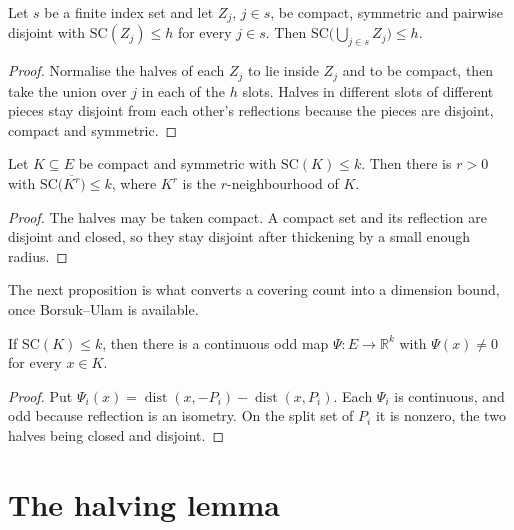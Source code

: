 \begin{lemma}
\label{lem:split-cover-union}
\leanok
Let $s$ be a finite index set and let $Z_j$, $j \in s$, be compact, symmetric and
pairwise disjoint with $\mathrm{SC}(Z_j) \le h$ for every $j \in s$. Then
$\mathrm{SC}\bigl( \bigcup_{j \in s} Z_j \bigr) \le h$.
\end{lemma}
\begin{proof}
\leanok
{}
Normalise the halves of each $Z_j$ to lie inside $Z_j$ and to be compact, then take
the union over $j$ in each of the $h$ slots. Halves in different slots of different
pieces stay disjoint from each other's reflections because the pieces are disjoint,
compact and symmetric.
\end{proof}

\begin{lemma}
\label{lem:split-cover-thickening}
\leanok
{}
Let $K \subseteq E$ be compact and symmetric with $\mathrm{SC}(K) \le k$. Then there
is $r > 0$ with $\mathrm{SC}\bigl( \overline{K^r} \bigr) \le k$, where $K^r$ is the
$r$-neighbourhood of $K$.
\end{lemma}
\begin{proof}
\leanok
The halves may be taken compact. A compact set and its reflection are disjoint and
closed, so they stay disjoint after thickening by a small enough radius.
\end{proof}

The next proposition is what converts a covering count into a dimension bound, once
Borsuk--Ulam is available.

\begin{proposition}
\label{prop:split-cover-odd-map}
\leanok
{}
If $\mathrm{SC}(K) \le k$, then there is a continuous odd map
$\Psi : E \to \mathbb{R}^k$ with $\Psi(x) \neq 0$ for every $x \in K$.
\end{proposition}
\begin{proof}
\leanok
Put $\Psi_i(x) = \operatorname{dist}(x, -P_i) - \operatorname{dist}(x, P_i)$. Each
$\Psi_i$ is continuous, and odd because reflection is an isometry. On the split set of
$P_i$ it is nonzero, the two halves being closed and disjoint.
\end{proof}

\chapter{The halving lemma}
\label{ch:halving}

